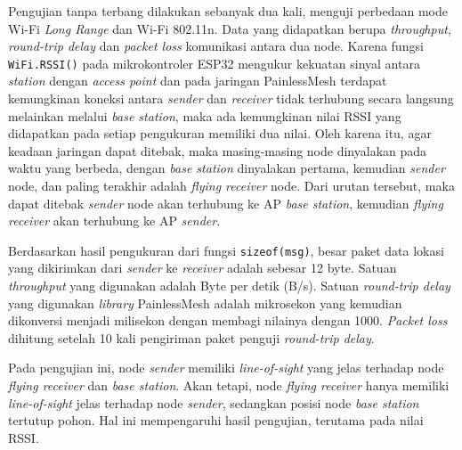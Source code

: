 Pengujian tanpa terbang dilakukan sebanyak dua kali, menguji perbedaan mode Wi-Fi \textit{Long Range} dan Wi-Fi 802.11n. Data yang didapatkan berupa \textit{throughput, round-trip delay} dan \textit{packet loss} komunikasi antara dua node. Karena fungsi \verb|WiFi.RSSI()| pada mikrokontroler ESP32 mengukur kekuatan sinyal antara \textit{station} dengan \textit{access point} dan pada jaringan PainlessMesh terdapat kemungkinan koneksi antara \textit{sender} dan \textit{receiver} tidak terhubung secara langsung melainkan melalui \textit{base station}, maka ada kemungkinan nilai RSSI yang didapatkan pada setiap pengukuran memiliki dua nilai. Oleh karena itu, agar keadaan jaringan dapat ditebak, maka masing-masing node dinyalakan pada waktu yang berbeda, dengan \textit{base station} dinyalakan pertama, kemudian \textit{sender} node, dan paling terakhir adalah \textit{flying receiver} node. Dari urutan tersebut, maka dapat ditebak \textit{sender} node akan terhubung ke AP \textit{base station}, kemudian \textit{flying receiver} akan terhubung ke AP \textit{sender}.

Berdasarkan hasil pengukuran dari fungsi \verb|sizeof(msg)|, besar paket data lokasi yang dikirimkan dari \textit{sender} ke \textit{receiver} adalah sebesar 12 byte. Satuan \textit{throughput} yang digunakan adalah Byte per detik (B/s).  Satuan \textit{round-trip delay} yang digunakan \textit{library} PainlessMesh adalah mikrosekon yang kemudian dikonversi menjadi milisekon dengan membagi nilainya dengan 1000. \textit{Packet loss} dihitung setelah 10 kali pengiriman paket penguji \textit{round-trip delay}.

Pada pengujian ini, node \textit{sender} memiliki \textit{line-of-sight} yang jelas terhadap node \textit{flying receiver} dan \textit{base station}. Akan tetapi, node \textit{flying receiver} hanya memiliki \textit{line-of-sight} jelas terhadap node \textit{sender}, sedangkan posisi node \textit{base station} tertutup pohon. Hal ini mempengaruhi hasil pengujian, terutama pada nilai RSSI.

